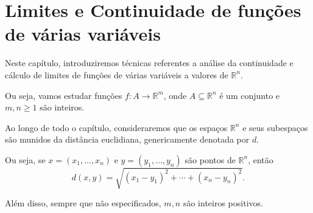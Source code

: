 \chapter{Limites e Continuidade de funções de várias variáveis}
Neste capítulo, introduziremos técnicas referentes a análise da continuidade e cálculo de limites de funções de várias variáveis a valores de $\mathbb R^n$.

Ou seja, vamos estudar funções $f: A\to \mathbb R^m$, onde $A\subseteq \mathbb R^n$ é um conjunto e $m, n\geq 1$ são inteiros.


Ao longo de todo o capítulo, consideraremos que os espaços $\mathbb R^n$ e seus subespaços são munidos da distância euclidiana, genericamente denotada por $d$.

Ou seja, se $x=(x_1, \dots, x_n)$ e $y=(y_1, \dots, y_n)$ são pontos de $\mathbb R^n$, então
\[
    d(x, y) = \sqrt{(x_1 - y_1)^2 + \cdots + (x_n - y_n)^2}.
\]

Além disso, sempre que não especificados, $m, n$ são inteiros positivos.





